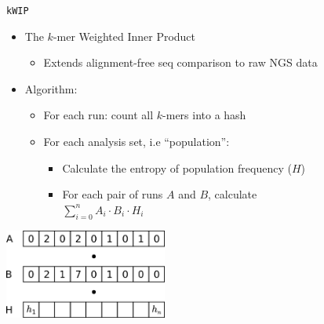 \documentclass[t]{beamer}
\begin{document}
\begin{frame}{\texttt{kWIP}}
  \begin{itemize}
    \item The $k$-mer Weighted Inner Product
      \begin{itemize}
        \item Extends alignment-free seq comparison to raw NGS data
      \end{itemize}
    \pause
    \item Algorithm:
      \begin{itemize}
        \item For each run: count all $k$-mers into a hash
        \pause
        \item For each analysis set, i.e ``population'':
          \begin{itemize}
            \item Calculate the entropy of population frequency ($H$)
            \item For each pair of runs $A$ and $B$, calculate \\
              $\sum\limits^{n}_{i=0} A_i \cdot B_i \cdot H_i$
          \end{itemize}
      \end{itemize}
  \end{itemize}
  \begin{center}
    \includegraphics[width=0.4\textwidth]{img/hash-wip.png}
  \end{center}
\end{frame}
\end{document}
